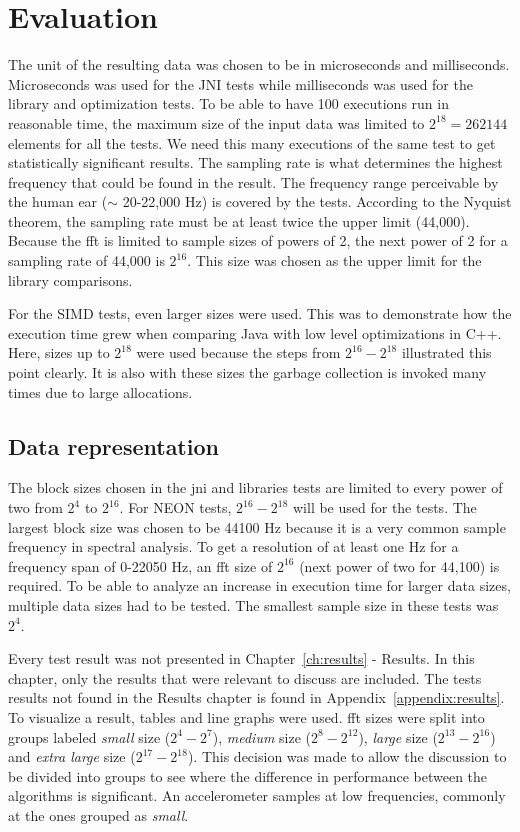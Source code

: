 \section{Evaluation}
The unit of the resulting data was chosen to be in microseconds and milliseconds. Microseconds was used for the JNI tests while milliseconds was used for the library and optimization tests. To be able to have 100 executions run in reasonable time, the maximum size of the input data was limited to $2^{18} = 262144$ elements for all the tests. We need this many executions of the same test to get statistically significant results. The sampling rate is what determines the highest frequency that could be found in the result. The frequency range perceivable by the human ear ($\sim$ 20-22,000 Hz) is covered by the tests. According to the Nyquist theorem, the sampling rate must be at least twice the upper limit (44,000). Because the \gls{fft} is limited to sample sizes of powers of 2, the next power of 2 for a sampling rate of 44,000 is $2^{16}$. This size was chosen as the upper limit for the library comparisons.

For the SIMD tests, even larger sizes were used. This was to demonstrate how the execution time grew when comparing Java with low level optimizations in C++. Here, sizes up to $2^{18}$ were used because the steps from $2^{16} - 2^{18}$ illustrated this point clearly. It is also with these sizes the garbage collection is invoked many times due to large allocations.

\subsection{Data representation}
The block sizes chosen in the \gls{jni} and libraries tests are limited to every power of two from $2^4$ to $2^{16}$. For NEON tests, $2^{16} - 2^{18}$ will be used for the tests. The largest block size was chosen to be 44100 Hz because it is a very common sample frequency in spectral analysis. To get a resolution of at least one Hz for a frequency span of 0-22050 Hz, an \gls{fft} size of $2^{16}$ (next power of two for 44,100) is required. To be able to analyze an increase in execution time for larger data sizes, multiple data sizes had to be tested. The smallest sample size in these tests was $2^4$.

Every test result was not presented in Chapter~\ref{ch:results} - Results. In this chapter, only the results that were relevant to discuss are included. The tests results not found in the Results chapter is found in Appendix~\ref{appendix:results}. To visualize a result, tables and line graphs were used. \gls{fft} sizes were split into groups labeled \emph{small} size ($2^{4} - 2^{7}$), \emph{medium} size ($2^{8} - 2^{12}$), \emph{large} size ($2^{13} - 2^{16}$) and \emph{extra large} size ($2^{17} - 2^{18}$). This decision was made to allow the discussion to be divided into groups to see where the difference in performance between the algorithms is significant. An accelerometer samples at low frequencies, commonly at the ones grouped as \emph{small}.

